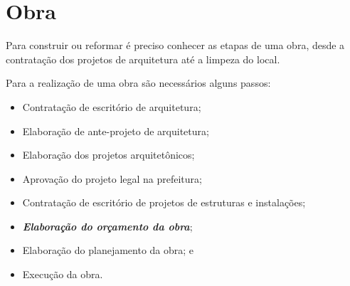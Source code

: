 \chapter{Obra}
Para construir ou reformar é preciso conhecer as etapas de uma obra, desde a contratação dos projetos de arquitetura até a limpeza do local.

Para a realização de uma obra são necessários alguns passos:

\begin{itemize}
	\item Contratação de escritório de arquitetura;
	\item Elaboração de ante-projeto de arquitetura;
	\item Elaboração dos projetos arquitetônicos;
	\item Aprovação do projeto legal na prefeitura;
	\item Contratação de escritório de projetos de estruturas e instalações;
	\item \emph{\textbf{Elaboração do orçamento da obra}};
	\item Elaboração do planejamento da obra; e
	\item Execução da obra.
\end{itemize}